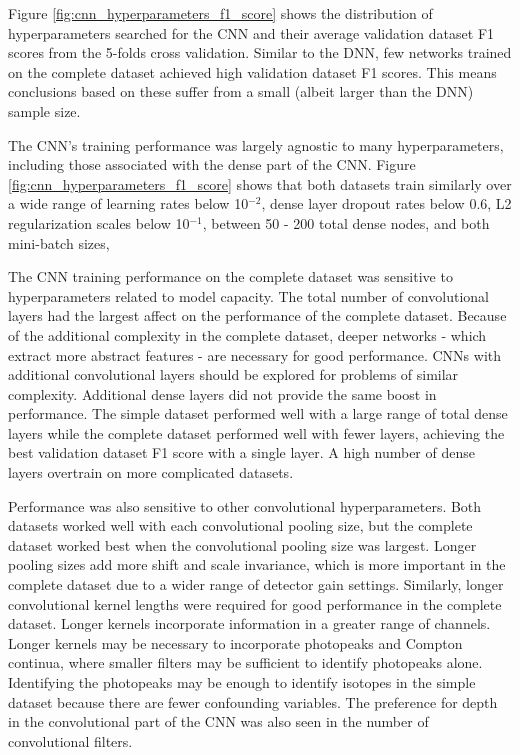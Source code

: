 Figure \ref{fig:cnn_hyperparameters_f1_score} shows the distribution of hyperparameters searched for the CNN and their average validation dataset F1 scores from the 5-folds cross validation. Similar to the DNN, few networks trained on the complete dataset achieved high validation dataset F1 scores. This means conclusions based on these suffer from a small (albeit larger than the DNN) sample size.

The CNN's training performance was largely agnostic to many hyperparameters, including those associated with the dense part of the CNN. Figure \ref{fig:cnn_hyperparameters_f1_score} shows that both datasets train similarly over a wide range of learning rates below 10$^{-2}$, dense layer dropout rates below 0.6, L2 regularization scales below 10$^{-1}$, between 50 - 200 total dense nodes, and both mini-batch sizes, 

The CNN training performance on the complete dataset was sensitive to hyperparameters related to model capacity. The total number of convolutional layers had the largest affect on the performance of the complete dataset. Because of the additional complexity in the complete dataset, deeper networks - which extract more abstract features - are necessary for good performance. CNNs with additional convolutional layers should be explored for problems of similar complexity. Additional dense layers did not provide the same boost in performance. The simple dataset performed well with a large range of total dense layers while the complete dataset performed well with fewer layers, achieving the best validation dataset F1 score with a single layer. A high number of dense layers overtrain on more complicated datasets. 

Performance was also sensitive to other convolutional hyperparameters. Both datasets worked well with each convolutional pooling size, but the complete dataset worked best when the convolutional pooling size was largest. Longer pooling sizes add more shift and scale invariance, which is more important in the complete dataset due to a wider range of detector gain settings. Similarly, longer convolutional kernel lengths were required for good performance in the complete dataset. Longer kernels incorporate information in a greater range of channels. Longer kernels may be necessary to incorporate photopeaks and Compton continua, where smaller filters may be sufficient to identify photopeaks alone. Identifying the photopeaks may be enough to identify isotopes in the simple dataset because there are fewer confounding variables. The preference for depth in the convolutional part of the CNN was also seen in the number of convolutional filters.

